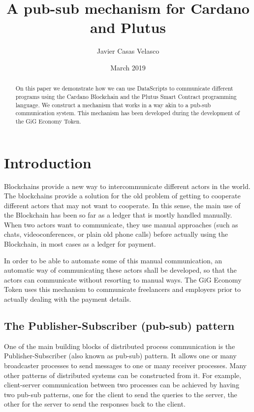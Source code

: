 \documentclass{article}
\begin{document}
\title{A pub-sub mechanism for Cardano and Plutus}
\author{Javier Casas Velasco}
\date{March 2019}
\maketitle

\begin{abstract}
  On this paper we demonstrate how we can use DataScripts to communicate different programs using the Cardano Blockchain and the Plutus Smart Contract programming language. We construct a mechanism that works in a way akin to a pub-sub communication system. This mechanism has been developed during the development of the GiG Economy Token\cite{gig-token}.
\end{abstract}

\tableofcontents

\pagebreak

\section{Introduction}
Blockchains provide a new way to intercommunicate different actors in the world. The blockchains provide a solution for the old problem of getting to cooperate different actors that may not want to cooperate. In this sense, the main use of the Blockchain has been so far as a ledger that is mostly handled manually. When two actors want to communicate, they use manual approaches (such as chats, videoconferences, or plain old phone calls) before actually using the Blockchain, in most cases as a ledger for payment.

In order to be able to automate some of this manual communication, an automatic way of communicating these actors shall be developed, so that the actors can communicate without resorting to manual ways. The GiG Economy Token\cite{gig-token} uses this mechanism to communicate freelancers and employers prior to actually dealing with the payment details.

\subsection{The Publisher-Subscriber (pub-sub) pattern}

One of the main building blocks of distributed process communication is the Publisher-Subscriber (also known as pub-sub) pattern. It allows one or many broadcaster processes to send messages to one or many receiver processes. Many other patterns of distributed systems can be constructed from it.
For example, client-server communication between two processes can be achieved by having two pub-sub patterns, one for the client to send the queries to the server, the other for the server to send the responses back to the client.
\end{document}
